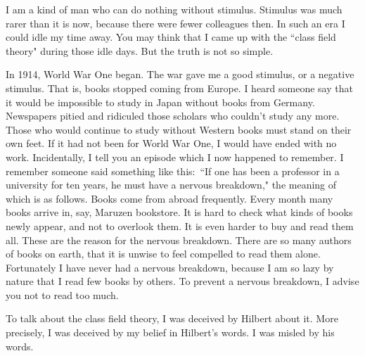 \documentclass[11pt,a4j,twocolumn]{jarticle}
\begin{document}
I am a kind of man who can do nothing without stimulus.
Stimulus was much rarer than it is now, because there were fewer colleagues then.
In such an era I could idle my time away.
You may think that I came up with the ``class field theory" during those idle days.
But the truth is not so simple.

In 1914, World War One began. The war gave me a good stimulus, or a negative stimulus.
That is, books stopped coming from Europe.
I heard someone say that it would be impossible to study in Japan without books from Germany.
Newspapers pitied and ridiculed those scholars who couldn't study any more.
Those who would continue to study without Western books must stand on their own feet.
If it had not been for World War One, I would have ended with no work.
Incidentally, I tell you an episode which I now happened to remember.
I remember someone said something like this:\
``If one has been a professor in a university for ten years, he must have a nervous breakdown,"
the meaning of which is as follows.
Books come from abroad frequently.
Every month many books arrive in, say, Maruzen bookstore.
It is hard to check what kinds of books newly appear, and not to overlook them.
It is even harder to buy and read them all.
These are the reason for the nervous breakdown.
There are so many authors of books on earth,
that it is unwise to feel compelled to read them alone.
Fortunately I have never had a nervous breakdown,
because I am so lazy by nature that I read few books by others.
To prevent a nervous breakdown, I advise you not to read too much.

To talk about the class field theory, I was deceived by Hilbert about it.
More precisely, I was deceived by my belief in Hilbert's words. I was misled by his words.
\end{document}
